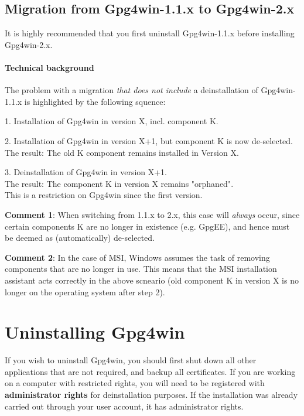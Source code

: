 \documentclass[a4paper,11pt,oneside,openright,titlepage]{scrbook}
\begin{document}
\clearpage
\section*{Migration from Gpg4win-1.1.x to Gpg4win-2.x}


It is highly recommended that you first uninstall Gpg4win-1.1.x before installing Gpg4win-2.x.

\subsubsection{Technical background}
The problem with a migration \textit{that does not include } a deinstallation of Gpg4win-1.1.x is highlighted by the following squence:

1. Installation of Gpg4win in version X, incl. component K.

2. Installation of Gpg4win in version X+1, but component K is now
de-selected.\\
The result: The old K component remains installed in Version X.

3. Deinstallation of Gpg4win in version X+1.\\
The result: The component K in version X remains "orphaned".\\
This is a restriction on Gpg4win since the first version.

\textbf{Comment 1}: When switching from 1.1.x to 2.x, this case will
\textit{always} occur, since certain components K are no longer in
existence (e.g. GpgEE), and hence must be deemed as (automatically)
de-selected.

\textbf{Comment 2}: In the case of MSI, Windows assumes the task of
removing components that are no longer in use. This means that the MSI
installation assistant acts correctly in the above scneario (old
component K in version X is no longer on the operating system after
step 2).


\clearpage
\chapter{Uninstalling Gpg4win}



If you wish to uninstall Gpg4win, you should first shut down all other
applications that are not required, and backup all certificates. If
you are working on a computer with restricted rights, you will need to
be registered with \textbf{administrator rights} for deinstallation
purposes. If the installation was already carried out through your
user account, it has administrator rights.
\end{document}
